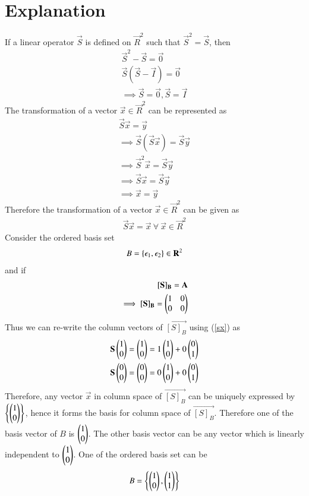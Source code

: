 \documentclass[journal,12pt,twocolumn]{IEEEtran}
\begin{document}
\section{Explanation}
If a linear operator $\vec{S}$ is defined on $\vec{R}^2$ such that $\vec{S}^2=\vec{S}$, then
\begin{align}
	\vec{S}^2-\vec{S}=\vec{0}\\
	\vec{S}(\vec{S}-\vec{I})=\vec{0}\\
	\implies\vec{S}=\vec{0},\vec{S}=\vec{I}
\end{align}
The transformation of a vector $\vec{x} \in \vec{R}^2$ can be represented as
\begin{align}
	\vec{S}\vec{x}=\vec{y}\\
	\implies \vec{S}(\vec{S}\vec{x})=\vec{S}\vec{y}\\
	\implies \vec{S}^2\vec{x}=\vec{S}\vec{y}\\
	\implies \vec{S}\vec{x}=\vec{S}\vec{y}\\
	\implies \vec{x}=\vec{y}
\end{align}
Therefore the transformation of a vector $\vec{x} \in \vec{R}^2$ can be given as
\begin{align}
	\vec{S}\vec{x}=\vec{x} \ \forall \ \vec{x} \in \vec{R}^2 \label{sx}
\end{align}
Consider the ordered basis set
\begin{align}
        B=\left\{\epsilon_1,\epsilon_2\right\} \in \mathbf{R}^2
\end{align}
and if
\begin{align}
\mathbf{[S]_B}=\mathbf{A} \\
        \implies \mathbf{[S]_B}=\begin{pmatrix}1&0\\0&0\end{pmatrix}
\end{align}
Thus we can re-write the column vectors of $\vec{[S]_B}$ using (\ref{sx}) as
\begin{align}
\mathbf{S}\begin{pmatrix}1\\0\end{pmatrix}=\begin{pmatrix}1\\0\end{pmatrix}=1\begin{pmatrix}1\\0\end{pmatrix}+0\begin{pmatrix}0\\1\end{pmatrix} \\
\mathbf{S}\begin{pmatrix}0\\0\end{pmatrix}=\begin{pmatrix}0\\0\end{pmatrix}=0\begin{pmatrix}1\\0\end{pmatrix}+0\begin{pmatrix}0\\1\end{pmatrix}
\end{align}
Therefore, any vector $\vec{x}$ in column space of $\vec{[S]_B}$ can be uniquely expressed by 
$\left\{\begin{pmatrix}1\\0\end{pmatrix}\right\}$, hence it forms the basis for column space of $\vec{[S]_B}$. Therefore 
one of the basis vector of $B$ is $\begin{pmatrix}1\\0\end{pmatrix}$. The other basis vector can be any vector which 
is linearly independent to $\begin{pmatrix}1\\0\end{pmatrix}$. One of the ordered basis set can be 
\begin{align}
	B=\left\{\begin{pmatrix}1\\0\end{pmatrix},\begin{pmatrix}1\\1\end{pmatrix}\right\}
\end{align}
\end{document}
